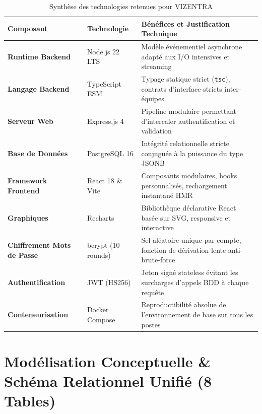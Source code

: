 \documentclass[11pt,a4paper]{article}
\begin{document}
\begin{table}[h!]
\centering
\small
\renewcommand{\arraystretch}{1.2}
\begin{tabularx}{\textwidth}{>{\bfseries}p{3.2cm} p{3.0cm} X}
    \toprule
    \rowcolor{tableheader}
    \color{white}Composant & \color{white}Technologie & \color{white}Bénéfices et Justification Technique \\
    \midrule
    Runtime Backend & Node.js 22 LTS & Modèle événementiel asynchrone adapté aux I/O intensives et streaming \\
    \rowcolor{tablerowalt}
    Langage Backend & TypeScript ESM & Typage statique strict (\texttt{tsc}), contrats d'interface stricts inter-équipes \\
    Serveur Web & Express.js 4 & Pipeline modulaire permettant d'intercaler authentification et validation \\
    \rowcolor{tablerowalt}
    Base de Données & PostgreSQL 16 & Intégrité relationnelle stricte conjuguée à la puissance du type JSONB \\
    Framework Frontend & React 18 \& Vite & Composants modulaires, hooks personnalisés, rechargement instantané HMR \\
    \rowcolor{tablerowalt}
    Graphiques & Recharts & Bibliothèque déclarative React basée sur SVG, responsive et interactive \\
    Chiffrement Mots de Passe & bcrypt (10 rounds) & Sel aléatoire unique par compte, fonction de dérivation lente anti-brute-force \\
    \rowcolor{tablerowalt}
    Authentification & JWT (HS256) & Jeton signé stateless évitant les surcharges d'appels BDD à chaque requête \\
    Conteneurisation & Docker Compose & Reproductibilité absolue de l'environnement de base sur tous les postes \\
    \bottomrule
\end{tabularx}
\caption{Synthèse des technologies retenues pour VIZENTRA}
\end{table}

\section{Modélisation Conceptuelle \& Schéma Relationnel Unifié (8 Tables)}
\end{document}
